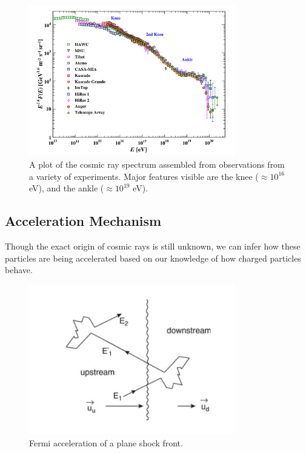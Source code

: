 \begin{figure}[h]
\centering
\includegraphics[width=0.8\textwidth]{figs/CR_Spectrum.png}
\caption{A plot of the cosmic ray spectrum assembled from observations from a variety of experiments. Major features visible are the knee ($\approx 10^{16} $ eV), and the ankle ($\approx 10^{19}$ eV). ~\cite{AustinThesis} }
\label{fig:CRSpectrum}
\end{figure}

\subsection{Acceleration Mechanism}
Though the exact origin of cosmic rays is still unknown, we can infer how these particles are being accelerated based on our knowledge of how charged particles behave. 
\begin{figure}[h]
\centering
\includegraphics[width=0.8\textwidth]{figs/FermiFig.png}
\caption{Fermi acceleration of a plane shock front\cite{pimenta_partphys}. }
\label{fig:fermifig}
\end{figure}

